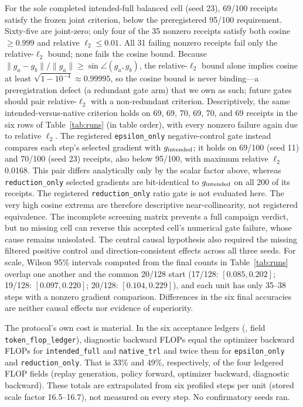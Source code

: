 \documentclass{article}
\begin{document}
For the sole completed intended-full balanced cell (seed 23), 69/100 receipts
satisfy the frozen joint criterion, below the preregistered 95/100 requirement.
Sixty-five are joint-zero; only four of the 35 nonzero receipts satisfy both
cosine $\geq 0.999$ and relative $\ell_2\leq 0.01$.  All 31 failing nonzero
receipts fail only the relative-$\ell_2$ bound; none fails the cosine bound.
Because $\lVert g_a-g_b\rVert/\lVert g_a\rVert\geq\sin\angle(g_a,g_b)$, the
relative-$\ell_2$ bound alone implies cosine at least
$\sqrt{1-10^{-4}}\approx0.99995$, so the cosine bound is never binding---a
preregistration defect (a redundant gate arm) that we own as such; future
gates should pair relative-$\ell_2$ with a non-redundant criterion.
Descriptively, the same intended-versus-native criterion holds on 69, 69, 70,
69, 70, and 69 receipts in the six rows of Table~\ref{tab:runs} (in table
order), with every nonzero failure again due to relative $\ell_2$.  The
registered \texttt{epsilon\_only} negative-control gate instead compares each
step's selected gradient with $g_{\rm intended}$; it holds on 69/100 (seed 11)
and 70/100 (seed 23) receipts, also below 95/100, with maximum relative
$\ell_2$ 0.0168.  This pair differs analytically only by the scalar factor
above, whereas \texttt{reduction\_only} selected gradients are bit-identical to
$g_{\rm intended}$ on all 200 of its receipts.  The registered
\texttt{reduction\_only} ratio gate is not evaluated here.  The very high cosine
extrema are therefore descriptive near-collinearity, not registered
equivalence.  The incomplete screening matrix prevents a full campaign
verdict, but no missing cell can reverse this accepted cell's numerical gate
failure, whose cause remains unisolated.  The
central causal hypothesis also required the missing filtered positive control
and direction-consistent effects across all three seeds.  For scale, Wilson
95\% intervals \citep{wilson1927probable} computed from the final counts in
Table~\ref{tab:runs} overlap one another and the common 20/128 start
(17/128: $[0.085,0.202]$; 19/128: $[0.097,0.220]$; 20/128: $[0.104,0.229]$),
and each unit has only 35--38 steps with a nonzero gradient comparison.
Differences in the six final accuracies are neither causal effects nor
evidence of superiority.

The protocol's own cost is material.  In the six acceptance ledgers
(, field
\texttt{token\_flop\_ledger}), diagnostic backward FLOPs equal the optimizer
backward FLOPs for \texttt{intended\_full} and \texttt{native\_trl} and twice
them for \texttt{epsilon\_only} and \texttt{reduction\_only}.  That is 33\%
and 49\%, respectively, of the four ledgered FLOP fields (replay generation,
policy forward, optimizer backward, diagnostic backward).  These totals are
extrapolated from six profiled steps per unit (stored scale factor
16.5--16.7), not measured on every step.
No confirmatory seeds ran.
\end{document}
